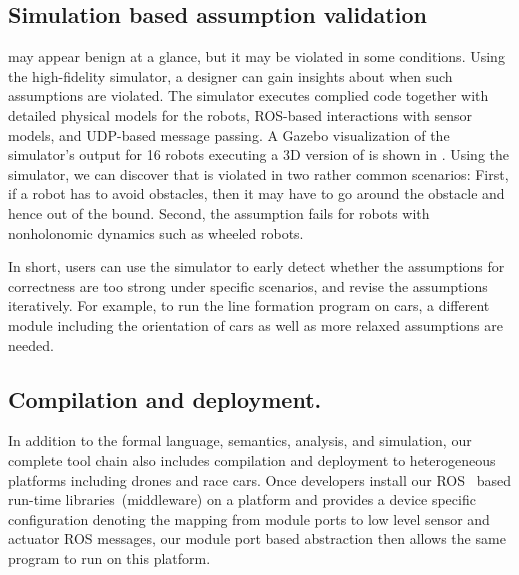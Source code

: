 \subsection{Simulation based assumption validation}

 may appear benign at a glance, but it may be violated in some conditions. Using the high-fidelity \lgname simulator, a designer can gain insights about when such assumptions are violated.
%
The simulator executes  complied \lgname code together with detailed physical  models for the robots, ROS-based interactions with sensor models, and UDP-based message passing.
%
A Gazebo visualization of the simulator's output for 16 robots executing a 3D version of \LineForm is shown in .
%
Using the \lgname simulator, we can discover that  is violated in two rather common scenarios:
First, if a robot has to avoid obstacles,
then it may have to go around the obstacle and hence out of the bound. Second, the assumption  fails for robots with nonholonomic dynamics such as wheeled robots. 

In short, users can use the simulator to early detect whether the assumptions for correctness are too strong under specific scenarios, and revise the assumptions iteratively.
For example, to run the line formation program on cars,
a different module including the orientation of cars as well as more relaxed assumptions are needed.

\subsection{Compilation and deployment.}
In addition to the formal language, semantics, analysis, and simulation,
our complete tool chain also includes compilation and deployment to heterogeneous platforms including drones and race cars.
Once developers install our ROS~\cite{ros} based run-time libraries~(middleware) on a platform
and provides a device specific configuration denoting the mapping from \lgname module ports
to low level sensor and actuator ROS messages,
our module port based abstraction then allows the same \lgname program to run on this platform.
